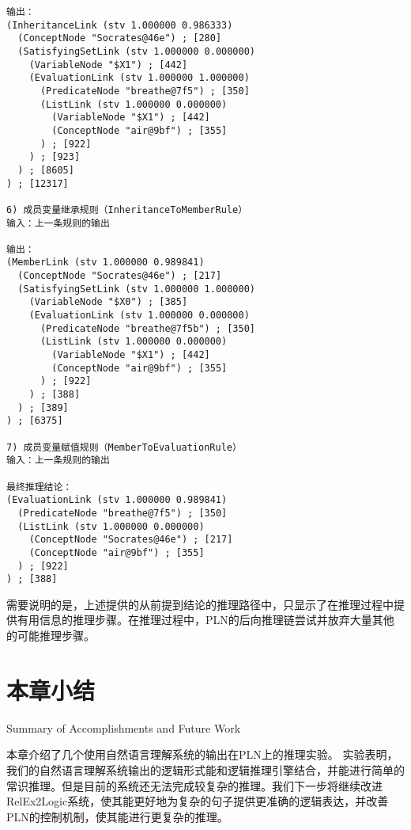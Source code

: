 {\begin{small}
\begin{lstlisting}
输出：
(InheritanceLink (stv 1.000000 0.986333)
  (ConceptNode "Socrates@46e") ; [280]
  (SatisfyingSetLink (stv 1.000000 0.000000)
    (VariableNode "$X1") ; [442]
    (EvaluationLink (stv 1.000000 1.000000)
      (PredicateNode "breathe@7f5") ; [350]
      (ListLink (stv 1.000000 0.000000)
        (VariableNode "$X1") ; [442]
        (ConceptNode "air@9bf") ; [355]
      ) ; [922]
    ) ; [923]
  ) ; [8605]
) ; [12317]

6) 成员变量继承规则（InheritanceToMemberRule）
输入：上一条规则的输出

输出：
(MemberLink (stv 1.000000 0.989841)
  (ConceptNode "Socrates@46e") ; [217]
  (SatisfyingSetLink (stv 1.000000 1.000000)
    (VariableNode "$X0") ; [385]
    (EvaluationLink (stv 1.000000 0.000000)
      (PredicateNode "breathe@7f5b") ; [350]
      (ListLink (stv 1.000000 0.000000)
        (VariableNode "$X1") ; [442]
        (ConceptNode "air@9bf") ; [355]
      ) ; [922]
    ) ; [388]
  ) ; [389]
) ; [6375]

7) 成员变量赋值规则（MemberToEvaluationRule）
输入：上一条规则的输出

最终推理结论：
(EvaluationLink (stv 1.000000 0.989841)
  (PredicateNode "breathe@7f5") ; [350]
  (ListLink (stv 1.000000 0.000000)
    (ConceptNode "Socrates@46e") ; [217]
    (ConceptNode "air@9bf") ; [355]
  ) ; [922]
) ; [388]
 \end{lstlisting}\end{small}}

\noindent 需要说明的是，上述提供的从前提到结论的推理路径中，只显示了在推理过程中提供有用信息的推理步骤。在推理过程中，PLN的后向推理链尝试并放弃大量其他的可能推理步骤。


\section{本章小结}{Summary of Accomplishments and Future Work}

本章介绍了几个使用自然语言理解系统的输出在PLN上的推理实验。 实验表明，我们的自然语言理解系统输出的逻辑形式能和逻辑推理引擎结合，并能进行简单的常识推理。但是目前的系统还无法完成较复杂的推理。我们下一步将继续改进RelEx2Logic系统，使其能更好地为复杂的句子提供更准确的逻辑表达，并改善PLN的控制机制，使其能进行更复杂的推理。
